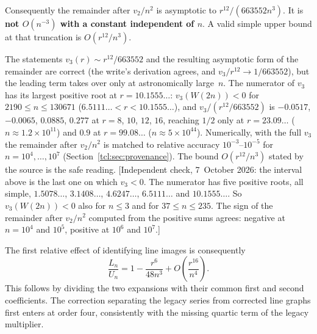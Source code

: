 Consequently the remainder after \(v_2/n^2\) is asymptotic to
\(r^{12}/(663552n^3)\). It is \textbf{not \(O(n^{-3})\) with a constant
independent of \(n\)}. A valid simple upper bound at that truncation is
\(O(r^{12}/n^3)\).
\begin{writenote}
The statements $v_3(r)\sim r^{12}/663552$ and the resulting asymptotic form of
the remainder are correct (the write's derivation agrees, and $v_3/r^{12}\to
1/663552$), but the leading term takes over only at astronomically large~$n$.
The numerator of $v_3$ has its largest positive root at $r=10.1555\ldots$:
$v_3(W(2n))<0$ for $2190\le n\le130671$ ($6.5111\ldots<r<10.1555\ldots$),
and $v_3/(r^{12}/663552)$ is $-0.0517$, $-0.0065$, $0.0885$, $0.277$ at
$r=8$, $10$, $12$, $16$, reaching $1/2$ only at $r=23.09\ldots$
($n\approx1.2\times10^{11}$) and $0.9$ at $r=99.08\ldots$
($n\approx5\times10^{44}$). Numerically, with the full $v_3$ the remainder
after $v_2/n^2$ is matched to relative accuracy $10^{-3}$--$10^{-5}$ for
$n=10^4,\ldots,10^7$ (Section~\ref{tcl:sec:provenance}). The bound
$O(r^{12}/n^3)$ stated by the source is the safe reading.
[Independent check, 7~October 2026: the interval above is the last one on
which $v_3<0$. The numerator has five positive roots, all simple, $1.5078\ldots$,
$3.1408\ldots$, $4.6247\ldots$, $6.5111\ldots$ and $10.1555\ldots$. So
$v_3(W(2n))<0$ also for $n\le3$ and for $37\le n\le235$. The sign of the
remainder after $v_2/n^2$ computed from the positive sums agrees: negative at
$n=10^4$ and $10^5$, positive at $10^6$ and $10^7$.]
\end{writenote}


The first relative effect of identifying line images is consequently
\[
\frac{L_n}{U_n}=1-\frac{r^6}{48n^3}+O\left(\frac{r^{16}}{n^4}\right).
\]
This follows by dividing the two expansions with their common first and
second coefficients. The correction separating the legacy series from
corrected line graphs first enters at order four, consistently with the
missing quartic term of the legacy multiplier.
